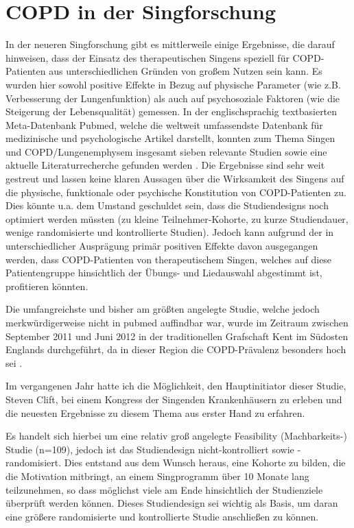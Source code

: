 \section{COPD in der Singforschung}
In der neueren Singforschung gibt es mittlerweile einige Ergebnisse, die darauf hinweisen, dass der Einsatz des therapeutischen Singens speziell für COPD-Patienten aus unterschiedlichen Gründen von großem Nutzen sein kann. Es wurden hier sowohl positive Effekte in Bezug auf physische Parameter (wie z.B. Verbesserung der Lungenfunktion) als auch auf psychosoziale Faktoren (wie die Steigerung der Lebensqualität) gemessen.
In der englischsprachig textbasierten Meta-Datenbank Pubmed, welche die weltweit umfassendste Datenbank für medizinische und psychologische Artikel darstellt, konnten zum Thema Singen und COPD/Lungenemphysem insgesamt sieben relevante Studien sowie eine aktuelle Literaturrecherche gefunden werden \autocite{pmid19436683,pmid20175359,pmid20682030,pmid23145504,pmid23497924,pmid23497929,pmid24398814,pmid24793633}. Die Ergebnisse sind sehr weit gestreut und lassen keine klaren Aussagen über die Wirksamkeit des Singens auf die physische, funktionale oder psychische Konstitution von COPD-Patienten zu. Dies könnte u.a. dem Umstand geschuldet sein, dass die Studiendesigns noch optimiert werden müssten (zu kleine Teilnehmer-Kohorte, zu kurze Studiendauer, wenige randomisierte und kontrollierte Studien). Jedoch kann aufgrund der in unterschiedlicher Ausprägung primär positiven Effekte davon ausgegangen werden, dass COPD-Patienten von therapeutischem Singen, welches auf diese Patientengruppe hinsichtlich der Übungs- und Liedauswahl abgestimmt ist, profitieren könnten.

Die umfangreichste und bisher am größten angelegte Studie, welche jedoch merkwürdigerweise nicht in pubmed auffindbar war, wurde im Zeitraum zwischen September 2011 und Juni 2012 in der traditionellen Grafschaft Kent im Südosten Englands durchgeführt, da in dieser Region die COPD-Prävalenz besonders hoch sei \autocite[vgl.][4]{clift2013}.

Im vergangenen Jahr hatte ich die Möglichkeit, den Hauptinitiator dieser Studie, Steven Clift, bei einem Kongress der Singenden Krankenhäusern zu erleben und die neuesten Ergebnisse zu diesem Thema aus erster Hand zu erfahren.

Es handelt sich hierbei um eine relativ groß angelegte Feasibility (Machbarkeits-) Studie (n=109), jedoch ist das Studiendesign nicht-kontrolliert sowie -randomisiert. Dies entstand aus dem Wunsch heraus, eine Kohorte zu bilden, die die Motivation mitbringt, an einem Singprogramm über 10 Monate lang teilzunehmen, so dass möglichst viele am Ende hinsichtlich der Studienziele überprüft werden können. Dieses Studiendesign sei wichtig als Basis, um daran eine größere randomisierte und kontrollierte Studie anschließen zu können. 

